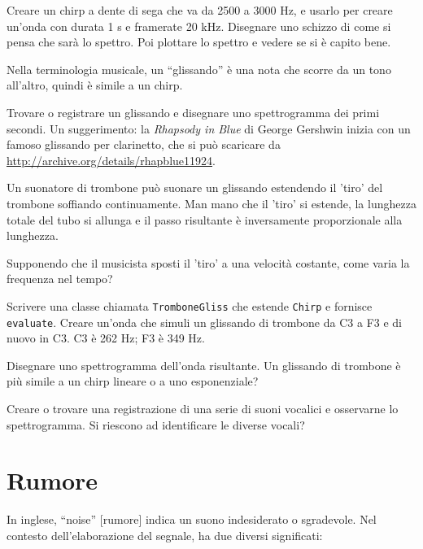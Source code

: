 \documentclass[12pt,a4paper]{book}
\begin{document}
\begin{exercise} Creare un chirp a dente di sega che va da 2500 a 3000 Hz, e usarlo per creare un'onda con durata 1 s e framerate 20 kHz. Disegnare uno schizzo di come si pensa che sarà lo spettro. Poi plottare lo spettro e vedere se si è capito bene. \end{exercise} 

\begin{exercise} Nella terminologia musicale, un ``glissando'' è una nota che scorre da un tono all'altro, quindi è simile a un chirp.

Trovare o registrare un glissando e disegnare uno spettrogramma dei primi secondi. Un suggerimento: la {\it Rhapsody in Blue} di George Gershwin inizia con un famoso glissando per clarinetto, che si può scaricare da \url{http://archive.org/details/rhapblue11924}. \end{exercise} 

\begin{exercise} Un suonatore di trombone può suonare un glissando estendendo il 'tiro' del trombone soffiando continuamente. Man mano che il 'tiro' si estende, la lunghezza totale del tubo si allunga e il passo risultante è inversamente proporzionale alla lunghezza.

Supponendo che il musicista sposti il 'tiro' a una velocità costante, come varia la frequenza nel tempo?

Scrivere una classe chiamata {\tt TromboneGliss} che estende {\tt Chirp} e fornisce {\tt evaluate}. Creare un'onda che simuli un glissando di trombone da C3 a F3 e di nuovo in C3. C3 è 262 Hz; F3 è 349 Hz.

Disegnare uno spettrogramma dell'onda risultante. Un glissando di trombone è più simile a un chirp lineare o a uno esponenziale? \end{exercise} 

\begin{exercise} Creare o trovare una registrazione di una serie di suoni vocalici e osservarne lo spettrogramma. Si riescono ad identificare le diverse vocali? \end{exercise} 

\chapter{Rumore} 

In inglese, ``noise'' [rumore] indica un suono indesiderato o sgradevole. Nel contesto dell'elaborazione del segnale, ha due diversi significati:
\end{document}
